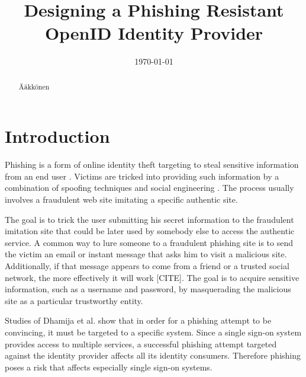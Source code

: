 \documentclass{tktltiki}
\begin{document}
\title{Designing a Phishing Resistant OpenID Identity Provider}
\author{}
\date{\today}
\maketitle


\onehalfspacing

\subject{Tietojenksittelytiede}


\begin{abstract}
  Ääkkönen
\end{abstract}

\setcounter{tocdepth}{3}
\mytableofcontents


\section{Introduction}

    Phishing is a form of online identity theft targeting to steal sensitive information from an end user   \cite{phishing_attacks_and_solutions_2007, why_phishing_works_06, suspectibility_to_phishing_2006}. Victims are tricked into providing such information by a combination of spoofing techniques and social engineering \cite{visual_similarity_phishing_2008}. The process usually involves a fraudulent web site imitating a specific authentic site. 

    The goal is to trick the user submitting his secret information to the fraudulent imitation site that could be later used by somebody else to access the authentic service. A common way to lure someone to a fraudulent phishing site is to send the victim an email or instant message that asks him to visit a malicious site. Additionally, if that message appears to come from a friend or a trusted social network, the more effectively it will work [CITE]. The goal is to acquire sensitive information, such as a username and password, by masquerading the malicious site as a particular trustworthy entity.

    Studies of Dhamija et al. \cite{why_phishing_works_06} show that in order for a phishing attempt to be convincing, it must be targeted to a specific system. Since a single sign-on system provides access to multiple services, a successful phishing attempt targeted against the identity provider affects all its identity consumers. Therefore phishing poses a risk that affects especially single sign-on systems. 
\end{document}
